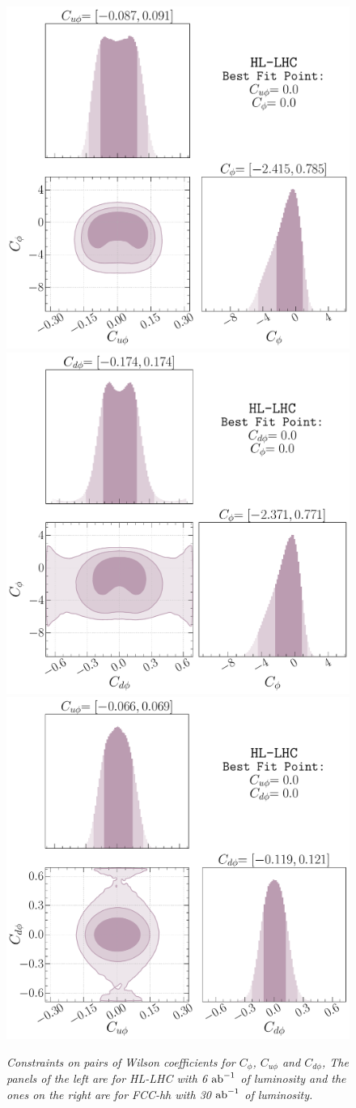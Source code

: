\begin{figure}[t!]
	\centering
	\includegraphics[width=0.47\linewidth]{fig/kappa_u-kappa_l-HL-LHC.pdf}
	\includegraphics[width=0.47\linewidth]{fig/kappa_d-kappa_l-HL-LHC.pdf}
	\includegraphics[width=0.47\linewidth]{fig/kappa_u-kappa_d-HL-LHC.pdf}
	\caption{\it Constraints on pairs of Wilson coefficients for $C_\phi$, $C_{u\phi}$ and $C_{d\phi}$, The panels of the left are for HL-LHC with 6 $\text{ab}^{-1}$ of luminosity and the ones on the right are for FCC-hh with 30 $\text{ab}^{-1}$ of luminosity.}
	\label{fig:constraint2d}
\end{figure}
\FloatBarrier

